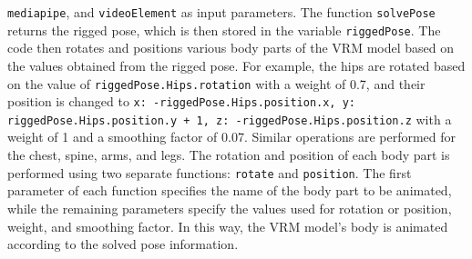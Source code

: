 \texttt{mediapipe}, and \texttt{videoElement} as input parameters. The function \texttt{solvePose} returns the rigged pose, which 
is then stored in the variable \texttt{riggedPose}.
The code then rotates and positions various body parts of the VRM model based on the values obtained from the 
rigged pose. For example, the hips are rotated based on the value of \texttt{riggedPose.Hips.rotation} with a weight 
of 0.7, and their position is changed to \texttt{x: -riggedPose.Hips.position.x, y: riggedPose.Hips.position.y + 1, z: 
-riggedPose.Hips.position.z} with a weight of 1 and a smoothing factor of 0.07. Similar operations are performed 
for the chest, spine, arms, and legs.
The rotation and position of each body part is performed using two separate functions: \texttt{rotate} and 
\texttt{position}. The first parameter of each function specifies the name of the body part to be animated, 
while the remaining parameters specify the values used for rotation or position, weight, and smoothing factor.
In this way, the VRM model's body is animated according to the solved pose information.


